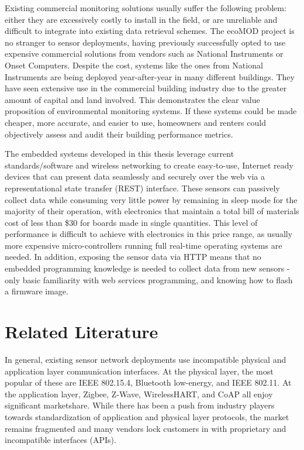 Existing commercial monitoring solutions usually suffer the following problem: either they are excessively costly to install in the field, or are unreliable and difficult to integrate into existing data retrieval schemes. The ecoMOD project is no stranger to sensor deployments, having previously successfully opted to use expensive commercial solutions from vendors such as National Instruments or Onset Computers. Despite the cost, systems like the ones from National Instruments are being deployed year-after-year in many different buildings. They have seen extensive use in the commercial building industry due to the greater amount of capital and land involved. This demonstrates the clear value proposition of environmental monitoring systems. If these systems could be made cheaper, more accurate, and easier to use, homeowners and renters could objectively assess and audit their building performance metrics.

The embedded systems developed in this thesis leverage current standards/software and wireless networking to create easy-to-use, Internet ready devices that can present data seamlessly and securely over the web via a representational state transfer (REST)\cite{fielding2002principled} interface. These sensors can passively collect data while consuming very little power by remaining in sleep mode for the majority of their operation, with electronics that maintain a total bill of materials  cost of less than \$30 for boards made in single quantities. This level of performance is difficult to achieve with electronics in this price range, as usually more expensive micro-controllers running full real-time operating systems are needed. In addition, exposing the sensor data via HTTP means that no embedded programming knowledge is needed to collect data from new sensors - only basic familiarity with web services programming, and knowing how to flash a firmware image.

\section{Related Literature}

In general, existing sensor network deployments use incompatible physical and application layer communication interfaces. At the physical layer, the most popular of these are IEEE 802.15.4, Bluetooth low-energy, and IEEE 802.11. At the application layer, Zigbee, Z-Wave, WirelessHART, and CoAP all enjoy significant marketshare. While there has been a push from industry players towards standardization of application and physical layer protocols, the market remains fragmented and many vendors lock customers in with proprietary and incompatible interfaces (APIs).

